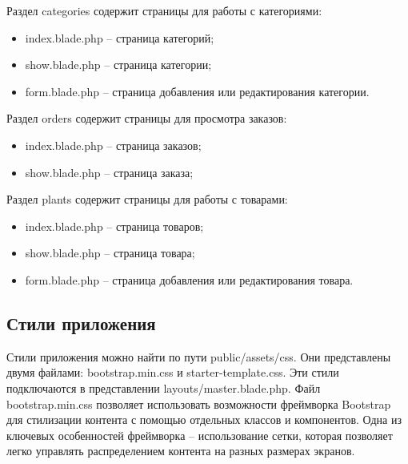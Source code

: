 Раздел categories содержит страницы для работы с категориями:
\begin{itemize}
	\item index.blade.php – страница категорий;
	\item show.blade.php – страница категории;
	\item form.blade.php – страница добавления или редактирования категории.
\end{itemize}

Раздел orders содержит страницы для просмотра заказов:
\begin{itemize}
	\item index.blade.php – страница заказов;
	\item show.blade.php – страница заказа;
\end{itemize}

Раздел plants содержит страницы для работы с товарами:
\begin{itemize}
	\item index.blade.php – страница товаров;
	\item show.blade.php – страница товара;
	\item form.blade.php – страница добавления или редактирования товара.
\end{itemize}

\subsection{Стили приложения}
Стили приложения можно найти по пути public/assets/css. Они представлены двумя файлами: bootstrap.min.css и starter-template.css. Эти стили подключаются в представлении layouts/master.blade.php. Файл bootstrap.min.css позволяет использовать возможности фреймворка Bootstrap для стилизации контента с помощью отдельных классов и компонентов. Одна из ключевых особенностей фреймворка – использование сетки, которая позволяет легко управлять распределением контента на разных размерах экранов.
